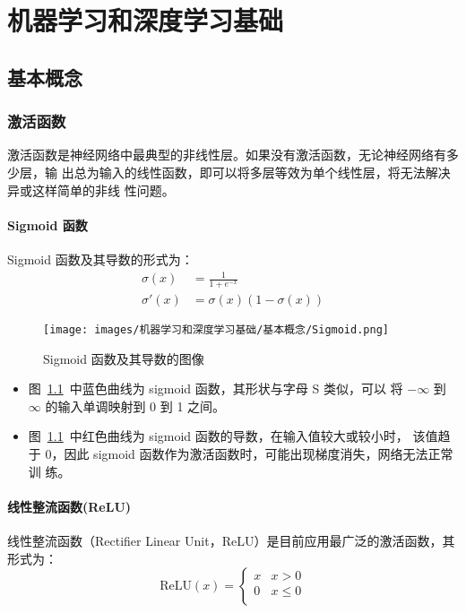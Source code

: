 \part{机器学习和深度学习基础}

\chapter{基本概念}

\section{激活函数}

激活函数是神经网络中最典型的非线性层。如果没有激活函数，无论神经网络有多少层，输
出总为输入的线性函数，即可以将多层等效为单个线性层，将无法解决异或这样简单的非线
性问题。

\subsection{Sigmoid 函数}
\label{subsec:Sigmoid}

Sigmoid 函数及其导数的形式为：
\begin{align}
  \label{equ:sigmoid}
  \sigma(x) & = \frac{1}{1 + e^{-x}} \\
  \label{equ:sigmoid-d}
  \sigma'(x) & = \sigma(x) (1-\sigma(x))
\end{align}

\begin{figure}[ht]
  \centering
  \texttt{[image: images/机器学习和深度学习基础/基本概念/Sigmoid.png]}
  \caption{Sigmoid 函数及其导数的图像}
  \label{fig:sigmoid}
\end{figure}

\begin{itemize}
  \item 图~\ref{fig:sigmoid}~中蓝色曲线为 sigmoid 函数，其形状与字母 S 类似，可以
    将 $-\infty$ 到 $\infty$ 的输入单调映射到 0 到 1 之间。
  \item 图~\ref{fig:sigmoid}~中红色曲线为 sigmoid 函数的导数，在输入值较大或较小时，
    该值趋于 0，因此 sigmoid 函数作为激活函数时，可能出现梯度消失，网络无法正常训
    练。
\end{itemize}

\subsection{线性整流函数(ReLU)}

线性整流函数（Rectifier Linear Unit，ReLU）是目前应用最广泛的激活函数，其形式为：
\begin{equation}
  \label{equ:ReLU}
  \mathrm{ReLU}(x) = \left\{
    \begin{array}{lr}
      x & x > 0 \\
      0 & x \leq 0 \\
    \end{array}
  \right.
\end{equation}


